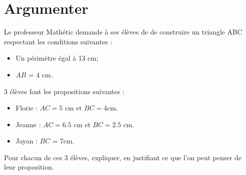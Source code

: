 \section{Argumenter}

Le professeur Mathétic demande à ses élèves de  de construire un triangle ABC respectant les conditions suivantes :

\begin{itemize}
	\item Un périmètre égal à 13 cm;
	\item $AB$ = 4 cm.
\end{itemize}

3 élèves font les propositions suivantes :
\begin{itemize}
	\item Florie : $AC = 5$ cm et $BC= \num{4}$cm.
	\item Jeanne :  $AC = \num{6.5}$ cm et $BC= \num{2.5}$ cm.
	\item Jayan : $BC$ = 7cm.
\end{itemize}

\begin{questions}
	\question Pour chacun de ces 3 élèves, expliquer, en justifiant ce que l'on peut penser de leur proposition.
\end{questions}